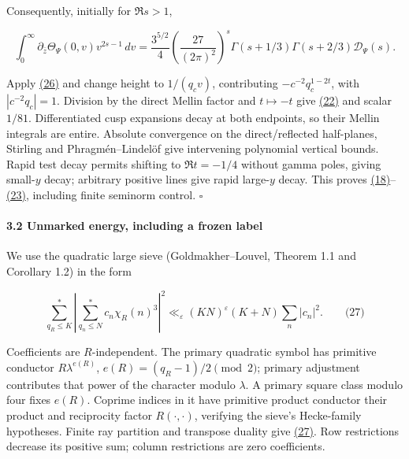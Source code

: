 Consequently, initially for \(\Re s>1\),

\hypertarget{cf:direct-mellin-identity}{}

\label{cf:direct-mellin-identity}

\[
\int_0^\infty\partial_{\bar z}\Theta_\Psi(0,v)v^{2s-1}\,dv
=\frac{3^{5/2}}4\left(\frac{27}{(2\pi)^2}\right)^s
\Gamma(s+1/3)\Gamma(s+2/3)\mathcal D_\Psi(s).
\]

Apply \protect\hyperlink{cf:eq:B.10}{(26)} and change height to \(1/(q_cv)\), contributing \(-c^{-2}q_c^{1-2t}\), with \(|c^{-2}q_c|=1\). Division by the direct Mellin factor and \(t\mapsto-t\) give \protect\hyperlink{cf:eq:B.6}{(22)} and scalar \(1/81\). Differentiated cusp expansions decay at both endpoints, so their Mellin integrals are entire. Absolute convergence on the direct/reflected half-planes, Stirling and Phragmén--Lindelöf give intervening polynomial vertical bounds. Rapid test decay permits shifting to \(\Re t=-1/4\) without gamma poles, giving small-\(y\) decay; arbitrary positive lines give rapid large-\(y\) decay. This proves \protect\hyperlink{cf:eq:B.2}{(18)}--\protect\hyperlink{cf:eq:B.7}{(23)}, including finite seminorm control. \(\square\)

\hypertarget{cf:sec:B.2}{}

\label{cf:sec:B.2}

\hypertarget{unmarked-energy-including-a-frozen-label}{%
\paragraph{3.2 Unmarked energy, including a frozen label}\label{unmarked-energy-including-a-frozen-label}}

We use the quadratic large sieve (Goldmakher--Louvel, Theorem 1.1 and Corollary 1.2) in the form

\hypertarget{cf:eq:B.11}{}

\label{cf:eq:B.11}

\[
\sum_{q_R\le K}^{*}\left|\sum_{q_n\le N}^{*}c_n\chi_R(n)^3\right|^2
\ll_\varepsilon(KN)^\varepsilon(K+N)\sum_n|c_n|^2.
\qquad\text{(27)}
\]

Coefficients are \(R\)-independent. The primary quadratic symbol has primitive conductor \(R\lambda^{e(R)}\), \(e(R)=(q_R-1)/2\pmod2\); primary adjustment contributes that power of the character modulo \(\lambda\). A primary square class modulo four fixes \(e(R)\). Coprime indices in it have primitive product conductor their product and reciprocity factor \(R(\cdot,\cdot)\), verifying the sieve's Hecke-family hypotheses. Finite ray partition and transpose duality give \protect\hyperlink{cf:eq:B.11}{(27)}. Row restrictions decrease its positive sum; column restrictions are zero coefficients.

